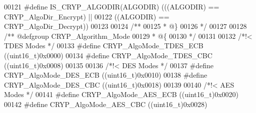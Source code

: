\begin{DoxyCode}
00121 \textcolor{preprocessor}{#}\textcolor{preprocessor}{define} \textcolor{preprocessor}{IS\_CRYP\_ALGODIR}\textcolor{preprocessor}{(}\textcolor{preprocessor}{ALGODIR}\textcolor{preprocessor}{)} \textcolor{preprocessor}{(}\textcolor{preprocessor}{(}\textcolor{preprocessor}{(}\textcolor{preprocessor}{ALGODIR}\textcolor{preprocessor}{)} \textcolor{preprocessor}{==} CRYP_AlgoDir_Encrypt\textcolor{preprocessor}{)} \textcolor{preprocessor}{||}
00122                                   \textcolor{preprocessor}{(}\textcolor{preprocessor}{(}\textcolor{preprocessor}{ALGODIR}\textcolor{preprocessor}{)} \textcolor{preprocessor}{==} CRYP_AlgoDir_Decrypt\textcolor{preprocessor}{)}\textcolor{preprocessor}{)}
00123 
00124 \textcolor{comment}{/**}
00125 \textcolor{comment}{  * @\}}
00126 \textcolor{comment}{  */}
00127 
00128 \textcolor{comment}{/** @defgroup CRYP\_Algorithm\_Mode }
00129 \textcolor{comment}{  * @\{}
00130 \textcolor{comment}{  */}
00131 
00132 \textcolor{comment}{/*!< TDES Modes */}
00133 \textcolor{preprocessor}{#}\textcolor{preprocessor}{define} \textcolor{preprocessor}{CRYP\_AlgoMode\_TDES\_ECB}    \textcolor{preprocessor}{(}\textcolor{preprocessor}{(}\textcolor{preprocessor}{uint16\_t}\textcolor{preprocessor}{)}0x0000\textcolor{preprocessor}{)}
00134 \textcolor{preprocessor}{#}\textcolor{preprocessor}{define} \textcolor{preprocessor}{CRYP\_AlgoMode\_TDES\_CBC}    \textcolor{preprocessor}{(}\textcolor{preprocessor}{(}\textcolor{preprocessor}{uint16\_t}\textcolor{preprocessor}{)}0x0008\textcolor{preprocessor}{)}
00135 
00136 \textcolor{comment}{/*!< DES Modes */}
00137 \textcolor{preprocessor}{#}\textcolor{preprocessor}{define} \textcolor{preprocessor}{CRYP\_AlgoMode\_DES\_ECB}     \textcolor{preprocessor}{(}\textcolor{preprocessor}{(}\textcolor{preprocessor}{uint16\_t}\textcolor{preprocessor}{)}0x0010\textcolor{preprocessor}{)}
00138 \textcolor{preprocessor}{#}\textcolor{preprocessor}{define} \textcolor{preprocessor}{CRYP\_AlgoMode\_DES\_CBC}     \textcolor{preprocessor}{(}\textcolor{preprocessor}{(}\textcolor{preprocessor}{uint16\_t}\textcolor{preprocessor}{)}0x0018\textcolor{preprocessor}{)}
00139 
00140 \textcolor{comment}{/*!< AES Modes */}
00141 \textcolor{preprocessor}{#}\textcolor{preprocessor}{define} \textcolor{preprocessor}{CRYP\_AlgoMode\_AES\_ECB}     \textcolor{preprocessor}{(}\textcolor{preprocessor}{(}\textcolor{preprocessor}{uint16\_t}\textcolor{preprocessor}{)}0x0020\textcolor{preprocessor}{)}
00142 \textcolor{preprocessor}{#}\textcolor{preprocessor}{define} \textcolor{preprocessor}{CRYP\_AlgoMode\_AES\_CBC}     \textcolor{preprocessor}{(}\textcolor{preprocessor}{(}\textcolor{preprocessor}{uint16\_t}\textcolor{preprocessor}{)}0x0028\textcolor{preprocessor}{)}

\end{DoxyCode}
